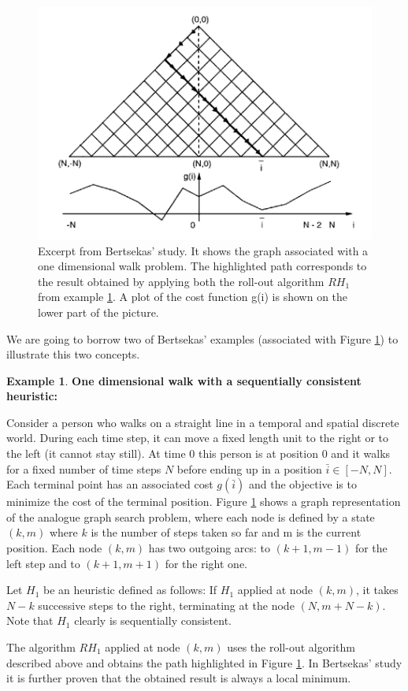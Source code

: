 \documentclass[12,twoside]{TFG-GM}
\theoremstyle{definition}
\newtheorem{example}[theorem]{Example}
\theoremstyle{remark}
\newcommand*\diff[1]{\bar{#1}}
\begin{document}
\begin{figure}[htb!]
\begin{center}
\includegraphics[width=16cm]{seq_cons.png}
\end{center}
\caption{\label{fig:one_d_walk} \small Excerpt from Bertsekas' study. It shows the graph associated with a one dimensional walk problem. The highlighted path corresponds to the result obtained by applying both the roll-out algorithm $RH_1$ from example \ref{one_d_walk_cons}. A plot of the cost function g(i) is shown on the lower part of the picture.}
\end{figure}

We are going to borrow two of Bertsekas' examples (associated with Figure \ref{fig:one_d_walk}) to illustrate this two concepts.

\begin{example} \label{one_d_walk_cons} \textbf{One dimensional walk with a sequentially consistent heuristic:}

Consider a person who walks on a straight line in a temporal and spatial discrete world. During each time step, it can move a fixed length unit to the right or to the left (it cannot stay still). At time 0 this person is at position 0 and it walks for a fixed number of time steps $N$ before ending up in a position $\diff{i} \in [-N, N]$. Each terminal point has an associated cost $g(\diff{i})$ and the objective is to minimize the cost of the terminal position. Figure \ref{fig:one_d_walk} shows a graph representation of the analogue graph search problem, where each node is defined by a state $(k, m)$ where $k$ is the number of steps taken so far and m is the current position. Each node $(k, m)$ has two outgoing arcs: to $(k + 1, m - 1)$ for the left step and to $(k + 1, m + 1)$ for the right one.

Let $H_1$ be an heuristic defined as follows: If $H_1$ applied at node $(k, m)$, it takes $N - k$ successive steps to the right, terminating at the node $(N, m + N - k)$. Note that $H_1$ clearly is sequentially consistent.

The algorithm $RH_1$ applied at node $(k, m)$ uses the roll-out algorithm described above and obtains the path highlighted in Figure \ref{fig:one_d_walk}. In Bertsekas' study it is further proven that the obtained result is always a local minimum.

\end{example}
\end{document}
